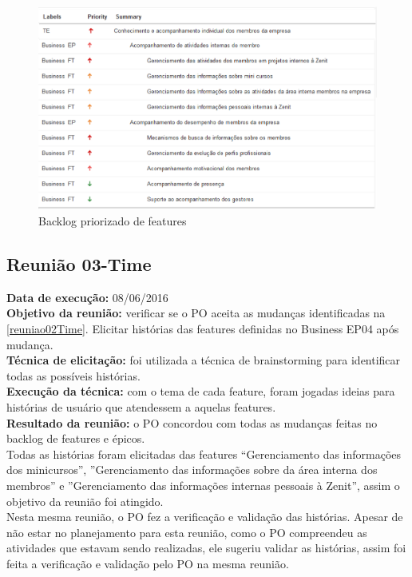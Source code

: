 \begin{figure}[H]
    \centering
    \includegraphics[keepaspectratio=true,scale=0.6]{figuras/blft03.eps}
    \caption[Backlog features]{Backlog priorizado de features\label{blft03}}
\end{figure}

\subsection{Reunião 03-Time}

 \indent \textbf{Data de execução:} 08/06/2016\\
 \indent \textbf{Objetivo da reunião:} verificar se o PO aceita as mudanças identificadas na \ref{reuniao02Time}. Elicitar histórias das features definidas no Business EP04 após mudança. \\
 \indent \textbf{Técnica de elicitação:} foi utilizada a técnica de brainstorming para identificar todas as possíveis histórias.\\
 \indent \textbf{Execução da técnica:} com o tema de cada feature, foram jogadas ideias para histórias de usuário que atendessem a aquelas features.\\
 \indent \textbf{Resultado da reunião:} o PO concordou com todas as mudanças feitas no backlog de features e épicos.\\
 \indent Todas as histórias foram elicitadas das features “Gerenciamento das informações dos minicursos”, ”Gerenciamento das informações sobre da área interna dos membros” e ”Gerenciamento das informações internas pessoais à Zenit”, assim o objetivo da reunião foi atingido.\\
 \indent Nesta mesma reunião, o PO fez a verificação e validação das histórias. Apesar de não estar no planejamento para esta reunião, como o PO compreendeu as atividades que estavam sendo realizadas, ele sugeriu validar as histórias, assim foi feita a verificação e validação pelo PO na mesma reunião.

